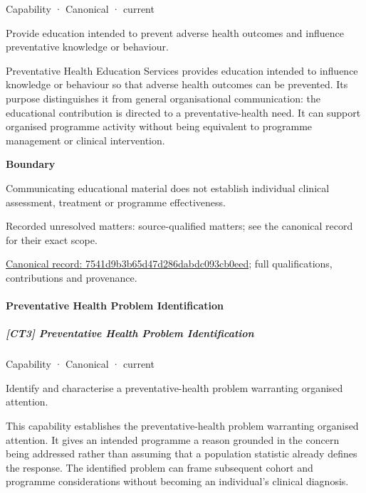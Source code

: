 \label{element:7541d9b3b65d47d286dabdc093cb0eed}
{\small Capability · Canonical · current}\par

Provide education intended to prevent adverse health outcomes and influence preventative knowledge or behaviour.



Preventative Health Education Services provides education intended to influence knowledge or behaviour so that adverse health outcomes can be prevented. Its purpose distinguishes it from general organisational communication: the educational contribution is directed to a preventative-health need. It can support organised programme activity without being equivalent to programme management or clinical intervention.



\textbf{Boundary}



Communicating educational material does not establish individual clinical assessment, treatment or programme effectiveness.


{\small Recorded unresolved matters: source-qualified matters; see the canonical record for their exact scope.}\par
{\footnotesize \href{../../../../continuum/strategy/capability/7541d9b3b65d47d286dabdc093cb0eed.md}{Canonical record: 7541d9b3b65d47d286dabdc093cb0eed}; full qualifications, contributions and provenance.}\par
\paragraph{Preventative Health Problem Identification}

\subparagraph{[CT3] Preventative Health Problem Identification}

\label{element:c1567022671f433fa1eeb37a9d156d92}
{\small Capability · Canonical · current}\par

Identify and characterise a preventative-health problem warranting organised attention.



This capability establishes the preventative-health problem warranting organised attention. It gives an intended programme a reason grounded in the concern being addressed rather than assuming that a population statistic already defines the response. The identified problem can frame subsequent cohort and programme considerations without becoming an individual's clinical diagnosis.



